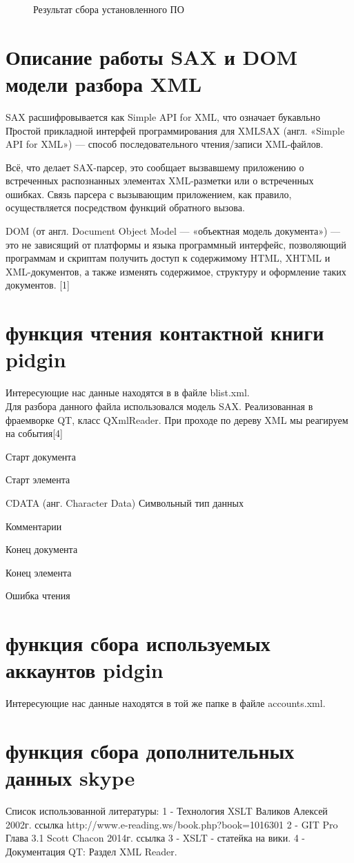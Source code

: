 \begin{figure}[h]
\caption{Результат сбора установленного ПО}
\label{pic:xml_to_xslt7}
\end{figure}

\chapter*{Описание работы SAX и DOM модели разбора XML}

SAX расшифровывается как Simple API for XML, что означает букавльно \"Простой прикладной интерфей программирования для XML\"

SAX (англ. «Simple API for XML») — способ последовательного чтения/записи XML-файлов.

Всё, что делает SAX-парсер, это сообщает вызвавшему приложению о встреченных распознанных элементах XML-разметки или о встреченных ошибках. Связь парсера с вызывающим приложением, как правило, осуществляется посредством функций обратного вызова.

DOM (от англ. Document Object Model — «объектная модель документа») — это не зависящий от платформы и языка программный интерфейс, позволяющий программам и скриптам получить доступ к содержимому HTML, XHTML и XML-документов, а также изменять содержимое, структуру и оформление таких документов.
[1]%
\chapter*{функция чтения контактной книги pidgin}
Интересующие нас данные находятся в %
в файле blist.xml.
\\Для разбора данного файла использовался модель SAX. Реализованная в фраемворке QT, класс QXmlReader. При проходе по дереву XML мы реагируем на события[4]
\item Старт документа
\item Старт элемента
\item CDATA (анг. Character Data) Символьный тип данных
\item Комментарии
\item Конец документа
\item Конец элемента
\item Ошибка чтения
\chapter*{функция сбора используемых аккаунтов pidgin}
Интересующие нас данные находятся в той же папке %
в файле accounts.xml.
\chapter*{функция сбора дополнительных данных skype}
Список использованной литературы:
1 -  Технология XSLT Валиков Алексей 2002г. ссылка http://www.e-reading.ws/book.php?book=1016301
2 -  GIT Pro Глава 3.1 Scott Chacon 2014г. ссылка 
3 -  XSLT - статейка на вики.
4 -  Документация QT: Раздел XML Reader.